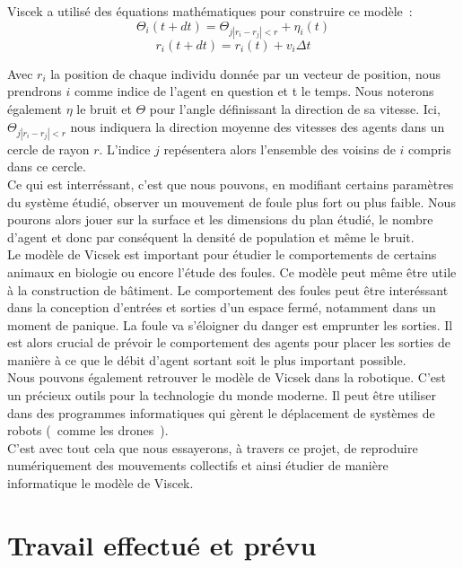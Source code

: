 \documentclass[french, a4paper, 12pt]{article}
\begin{document}
      \newpage
      
      Viscek a utilisé des équations mathématiques pour construire ce modèle~:
      \[
		\Theta_{i}(t+dt) = \Theta_{j |r_{i}-r_{j}|<r} + \eta_{i}(t)
	   \]
	   \[
		 r_{i}(t+dt) = r_{i}(t) + v_{i}\Delta t
	   \]
	
	
      Avec $r_{i}$ la position de chaque individu donnée par un vecteur de position, nous prendrons $i$ comme indice de l'agent en question et t le temps. Nous noterons également $\eta$ le bruit et $\Theta$ pour l’angle définissant la direction de sa vitesse. Ici, $\Theta_{j |r_{i}-r_{j}|<r}$ nous indiquera la direction moyenne des vitesses des agents dans un cercle de rayon $r$. L'indice $j$ repésentera alors l'ensemble des voisins de $i$ compris dans ce cercle.\\
      
      Ce qui est interréssant, c'est que nous pouvons, en modifiant certains paramètres du système étudié, observer un mouvement de foule plus fort ou plus faible. Nous pourons alors jouer sur la surface et les dimensions du plan étudié, le nombre d'agent et donc par conséquent la densité de population et même le bruit.\\

      Le modèle de Vicsek est important pour étudier le comportements de certains animaux en biologie ou encore l'étude des foules. Ce modèle peut même être utile à la construction de bâtiment. Le comportement des foules peut être interéssant dans la conception d'entrées et sorties d'un espace fermé, notamment dans un moment de panique. La foule va s'éloigner du danger est emprunter les sorties. Il est alors crucial de prévoir le comportement des agents pour placer les sorties de manière à ce que le débit d'agent sortant soit le plus important possible.\\
      
      Nous pouvons également retrouver le modèle de Vicsek dans la robotique. C'est un précieux outils pour la technologie du monde moderne. Il peut être utiliser dans des programmes informatiques qui gèrent le déplacement de systèmes de robots (~comme les drones~).\\ 
      
      C'est avec tout cela que nous essayerons, à travers ce projet, de reproduire numériquement des mouvements collectifs et ainsi étudier de manière informatique le modèle de Viscek.

\newpage

\section{Travail effectué et prévu}
\end{document}
